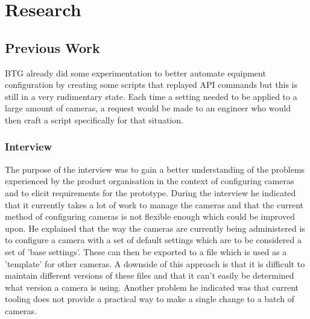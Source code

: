 \chapter{Research}

\section{Previous Work}
BTG already did some experimentation to better automate equipment configuration by creating some scripts that replayed API commands but this is still
in a very rudimentary state. Each time a setting needed to be applied to a large amount of cameras, a request would be made to an engineer who would then craft a script
specifically for that situation.





\subsection{Interview}
The purpose of the interview was to gain a better understanding of the problems experienced
by the product organisation in the context of configuring cameras and to elicit requirements for the prototype. During the interview he indicated that it currently takes a lot of work to manage
the cameras and that the current method of configuring cameras is not flexible enough which could be improved upon. He explained that the way the cameras are currently being
administered is to configure a camera with a set of default settings which are to be considered a set of 'base settings'. These can then be exported to a file which is used as a
'template' for other
cameras. A downside of this approach is that it is difficult to maintain different versions of these files and that it can't easily be determined what version a camera is using.
Another problem he indicated was that current tooling does not provide a practical way to make a single change to a batch of cameras.


